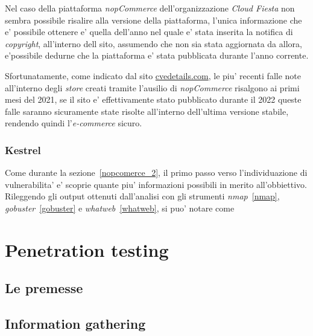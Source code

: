 \documentclass[a4paper]{report}
\begin{document}
				Nel caso della piattaforma \emph{nopCommerce} dell'organizzazione \emph{Cloud Fiesta} non sembra
				possibile risalire alla versione della piattaforma, l'unica informazione che e' possibile ottenere e'
				quella dell'anno nel quale e' stata inserita la notifica di \emph{copyright}, all'interno dell sito,
				assumendo che non sia stata aggiornata da allora, e'possibile dedurne che la piattaforma e' stata
				pubblicata durante l'anno corrente.

				Sfortunatamente, come indicato dal sito
				\href{https://www.cvedetails.com/vulnerability-list.php?vendor_id=19803&product_id=0&version_id=0&page=1&hasexp=0&opdos=0&opec=0&opov=0&opcsrf=0&opgpriv=0&opsqli=0&opxss=0&opdirt=0&opmemc=0&ophttprs=0&opbyp=0&opfileinc=0&opginf=0&cvssscoremin=0&cvssscoremax=0&year=0&cweid=0&order=1&trc=7&sha=e467697bc2d0e9c2996500ae46cf86049a8683c2}{cvedetails.com},
				le piu' recenti falle note all'interno degli \emph{store} creati tramite l'ausilio di \emph{nopCommerce}
				risalgono ai primi mesi del 2021, se il sito e' effettivamente stato pubblicato durante il 2022 queste
				falle saranno sicuramente state risolte all'interno dell'ultima versione stabile, rendendo quindi
				l'\emph{e-commerce} sicuro.

			\subsection{Kestrel}\label{kestrel}
				Come durante la sezione~\ref{nopcomerce_2}, il primo passo verso l'individuazione di vulnerabilita' e'
				scoprie quante piu' informazioni possibili in merito all'obbiettivo. Rileggendo gli output ottenuti
				dall'analisi con gli strumenti \emph{nmap}~\ref{nmap}, \emph{gobuster}~\ref{gobuster} e
				\emph{whatweb}~\ref{whatweb}, si puo' notare come

\chapter{Penetration testing}\label{penetration_testing}
	\section{Le premesse}\label{le_premesse}
	\section{Information gathering}\label{information_gathering}
\end{document}
